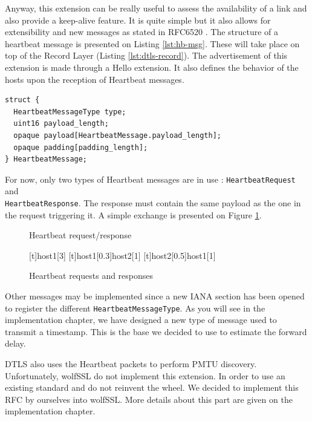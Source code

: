Anyway, this extension can be really useful to assess the availability of a link and also provide a keep-alive feature. It is quite simple but it also allows for extensibility and new messages as stated in RFC6520 \cite{rfc6520}. The structure of a heartbeat message is presented on Listing \ref{lst:hb-msg}. These will take place on top of the Record Layer (Listing \ref{lst:dtls-record}). The advertisement of this extension is made through a Hello extension. It also defines the behavior of the hosts upon the reception of Heartbeat messages.

\begin{lstlisting}[caption=Heartbeat message, label=lst:hb-msg]
struct {
  HeartbeatMessageType type;
  uint16 payload_length;
  opaque payload[HeartbeatMessage.payload_length];
  opaque padding[padding_length];
} HeartbeatMessage;
\end{lstlisting}

For now, only two types of Heartbeat messages are in use : \texttt{HeartbeatRequest} and\\ \texttt{HeartbeatResponse}. The response must contain the same payload as the one in the request triggering it. A simple exchange is presented on Figure \ref{fig:heartbeat}.

\begin{figure}[!h]
\centering
\begin{msc}[r]{Heartbeat request/response}

\setlength{\instfootheight}{0em}
\setlength{\instheadheight}{0em}
\setlength{\instdist}{0.7\linewidth}
\setlength{\levelheight}{3em}


[t]{}{host1}[3]
\nextlevel
{}[t]{host1}[0.3]{host2}[1]
\nextlevel
{}[t]{host2}[0.5]{host1}[1]
\nextlevel
\nextlevel
\end{msc}
\caption{Heartbeat requests and responses}
\label{fig:heartbeat}
\end{figure}

Other messages may be implemented since a new IANA section has been opened to register the different \texttt{HeartbeatMessageType}. As you will see in the implementation chapter, we have designed a new type of message used to transmit a timestamp. This is the base we decided to use to estimate the forward delay.


DTLS also uses the Heartbeat packets to perform PMTU discovery. Unfortunately, wolfSSL do not implement this extension. In order to use an existing standard and do not reinvent the wheel. We decided to implement this RFC by ourselves into wolfSSL. More details about this part are given on the implementation chapter.